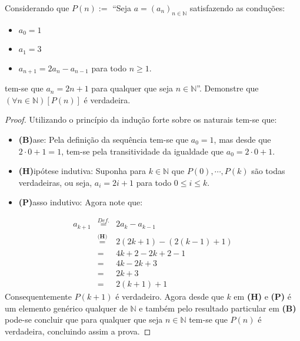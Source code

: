 \begin{exemplo}\label{exe:InducaoForte1}
	Considerando que $\displaystyle P(n) := $ ``Seja $a = (a_n)_{n \in \mathbb{N}}$ satisfazendo as conduções:
	\begin{itemize}
		\item $a_0 = 1$
		\item $a_1 = 3$
		\item $a_{n+1} = 2a_n - a_{n-1}$ para todo $n \ge 1$.
	\end{itemize}
	tem-se que $a_n = 2n + 1$ para qualquer que seja $n \in \mathbb{N}$''. Demonstre que $(\forall n \in \mathbb{N})[P(n)]$ é verdadeira.
	
	\begin{proof}
		Utilizando o princípio da indução forte sobre os naturais tem-se que:
		\begin{itemize}
			\item[ ] \textbf{(B)}ase: Pela definição da sequência tem-se que $a_0 = 1$, mas desde que $2\cdot 0 + 1 = 1$, tem-se pela transitividade da igualdade que $a_0 = 2\cdot 0 + 1$. 
			\item[ ] \textbf{(H)}ipótese indutiva:  Suponha para $k \in \mathbb{N}$ que $P(0), \cdots, P(k)$ são todas verdadeiras, ou seja, $a_i = 2i + 1$ para todo $0 \leq i \leq k$.
			\item[ ] \textbf{(P)}asso indutivo:  Agora note que:
		\end{itemize}
    \begin{eqnarray*}
			a_{k+1} & \stackrel{Def.}{=} & 2a_{k} - a_{k-1}\\
			& \stackrel{\textbf{(H)}}{=} &  2(2k+1) - (2(k-1) + 1)\\
			& = & 4k + 2 - 2k + 2 - 1\\
      & = & 4k - 2k + 3\\
			& = & 2k + 3\\
			& = & 2(k + 1) + 1
		\end{eqnarray*}
		Consequentemente $P(k+1)$ é verdadeiro.  Agora desde que $k$ em \textbf{(H)} e \textbf{(P)} é um elemento genérico qualquer de $\mathbb{N}$ e também pelo resultado particular em  \textbf{(B)} pode-se concluir que para qualquer que seja $n \in \mathbb{N}$ tem-se que $P(n)$ é verdadeira, concluindo assim a prova.
	\end{proof}
\end{exemplo}

